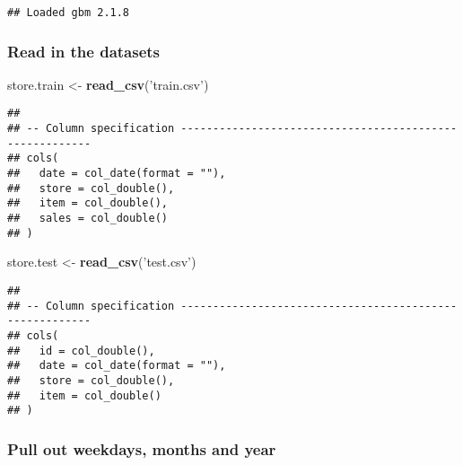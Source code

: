 \documentclass[]{article}
\newenvironment{Shaded}{\begin{snugshade}}{\end{snugshade}}
\newcommand{\DataTypeTok}[1]{\textcolor[rgb]{0.13,0.29,0.53}{#1}}
\newcommand{\KeywordTok}[1]{\textcolor[rgb]{0.13,0.29,0.53}{\textbf{#1}}}
\newcommand{\NormalTok}[1]{#1}
\newcommand{\OperatorTok}[1]{\textcolor[rgb]{0.81,0.36,0.00}{\textbf{#1}}}
\newcommand{\StringTok}[1]{\textcolor[rgb]{0.31,0.60,0.02}{#1}}
\begin{document}
\begin{verbatim}
## Loaded gbm 2.1.8
\end{verbatim}

\hypertarget{read-in-the-datasets}{%
\subsubsection{Read in the datasets}\label{read-in-the-datasets}}

\begin{Shaded}
\begin{Highlighting}[]
\NormalTok{store.train <-}\StringTok{ }\KeywordTok{read_csv}\NormalTok{(}\StringTok{'train.csv'}\NormalTok{)}
\end{Highlighting}
\end{Shaded}

\begin{verbatim}
## 
## -- Column specification --------------------------------------------------------
## cols(
##   date = col_date(format = ""),
##   store = col_double(),
##   item = col_double(),
##   sales = col_double()
## )
\end{verbatim}

\begin{Shaded}
\begin{Highlighting}[]
\NormalTok{store.test <-}\StringTok{ }\KeywordTok{read_csv}\NormalTok{(}\StringTok{'test.csv'}\NormalTok{)}
\end{Highlighting}
\end{Shaded}

\begin{verbatim}
## 
## -- Column specification --------------------------------------------------------
## cols(
##   id = col_double(),
##   date = col_date(format = ""),
##   store = col_double(),
##   item = col_double()
## )
\end{verbatim}

\begin{Shaded}
\end{Shaded}

\hypertarget{pull-out-weekdays-months-and-year}{%
\subsubsection{Pull out weekdays, months and
year}\label{pull-out-weekdays-months-and-year}}
\end{document}

